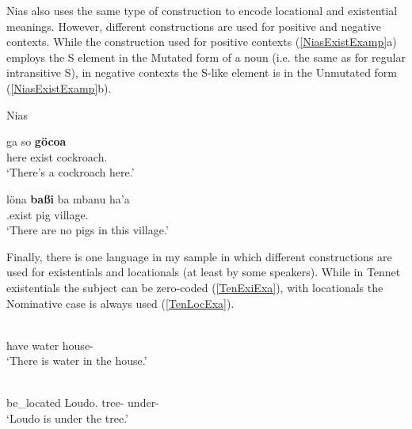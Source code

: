 Nias also uses the same type of construction to encode locational and existential meanings. 
However, different constructions are used for positive and negative contexts.
While the construction used for positive contexts (\ref{NiasExistExamp}a) employs the S element in the Mutated form of a noun (i.e. the same as for regular intransitive S), in negative contexts the S-like element is in the Unmutated form (\ref{NiasExistExamp}b).

\begin{exe} \ex\label{NiasExistExamp} {Nias} \citep[Sundic; Sumatra, Indonesia; ][344, 358]{Brown:2001}\nopagebreak[4]
\begin{xlist} \ex \gll ga so \textbf{g\"ocoa}\\
here exist cockroach.\mut{}\\
\glt `There's a cockroach here.'

\ex \gll l\"ona \textbf{ba{\ss}i} ba mbanu ha'a\\
\Neg{}.exist pig \loc{} village.\mut{} \prox{}\\
\glt `There are no pigs in this village.'
\end{xlist} 
\end{exe}

Finally, there is one language in my sample in which different constructions are used for existentials and locationals (at least by some speakers).
While in Tennet existentials the subject can be zero-coded (\ref{TenExiExa}), with locationals the Nominative case is always used (\ref{TenLocExa}).

\begin{exe}  \citep[Surmic; Sudan; ][236, 236]{Randal:1998}\nopagebreak[4]
 \begin{xlist}
\ex\label{TenExiExa}\gll{} \textbf{} \\
have water house-\obl{}\\
\glt `There is water in the house.' 

\ex\label{TenLocExa}\gll{} \textbf{}  \\
be\_located Loudo.\nom{} tree-\obl{} under-\obl{}\\
\glt `Loudo is under the tree.'
\end{xlist}
\end{exe}

